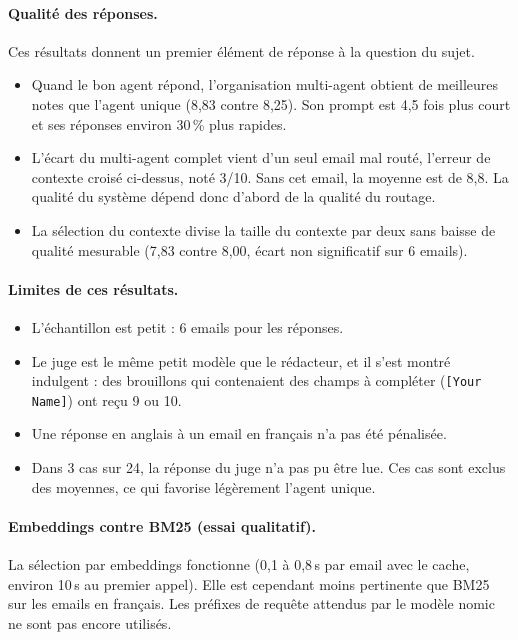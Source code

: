 \documentclass[11pt,a4paper]{article}
\newcommand{\code}[1]{\texttt{#1}}
\begin{document}
\paragraph{Qualité des réponses.} Ces résultats donnent un premier élément de réponse à
la question du sujet.
\begin{itemize}
  \item Quand le bon agent répond, l'organisation multi-agent obtient de meilleures notes
        que l'agent unique (8,83 contre 8,25). Son prompt est 4,5 fois plus court et ses
        réponses environ 30\,\% plus rapides.
  \item L'écart du multi-agent complet vient d'un seul email mal routé, l'erreur de
        contexte croisé ci-dessus, noté 3/10. Sans cet email, la moyenne est de 8,8. La
        qualité du système dépend donc d'abord de la qualité du routage.
  \item La sélection du contexte divise la taille du contexte par deux sans baisse de
        qualité mesurable (7,83 contre 8,00, écart non significatif sur 6 emails).
\end{itemize}

\paragraph{Limites de ces résultats.}
\begin{itemize}
  \item L'échantillon est petit : 6 emails pour les réponses.
  \item Le juge est le même petit modèle que le rédacteur, et il s'est montré indulgent :
        des brouillons qui contenaient des champs à compléter (\code{[Your Name]}) ont
        reçu 9 ou 10.
  \item Une réponse en anglais à un email en français n'a pas été pénalisée.
  \item Dans 3 cas sur 24, la réponse du juge n'a pas pu être lue. Ces cas sont exclus des
        moyennes, ce qui favorise légèrement l'agent unique.
\end{itemize}

\paragraph{Embeddings contre BM25 (essai qualitatif).} La sélection par embeddings
fonctionne (0,1 à 0,8\,s par email avec le cache, environ 10\,s au premier appel). Elle est
cependant moins pertinente que BM25 sur les emails en français. Les préfixes de requête
attendus par le modèle nomic ne sont pas encore utilisés.
\end{document}
